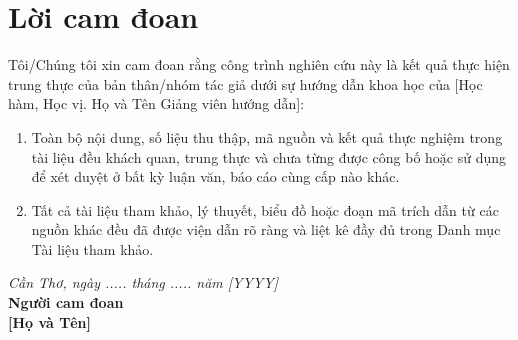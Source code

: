 
\chapter*{Lời cam đoan}

Tôi/Chúng tôi xin cam đoan rằng công trình nghiên cứu này là kết quả thực hiện trung thực của bản thân/nhóm tác giả dưới sự hướng dẫn khoa học của [Học hàm, Học vị. Họ và Tên Giảng viên hướng dẫn]:

\begin{enumerate}[leftmargin=*]
  \item Toàn bộ nội dung, số liệu thu thập, mã nguồn và kết quả thực nghiệm trong tài liệu đều khách quan, trung thực và chưa từng được công bố hoặc sử dụng để xét duyệt ở bất kỳ luận văn, báo cáo cùng cấp nào khác.
  \item Tất cả tài liệu tham khảo, lý thuyết, biểu đồ hoặc đoạn mã trích dẫn từ các nguồn khác đều đã được viện dẫn rõ ràng và liệt kê đầy đủ trong Danh mục Tài liệu tham khảo.
\end{enumerate}

\vspace{1cm}
\begin{flushright}
  \textit{Cần Thơ, ngày ..... tháng ..... năm [YYYY]}\\[0.5em]
  \textbf{Người cam đoan}\\[1.5cm]
  \textbf{[Họ và Tên]}
\end{flushright}
